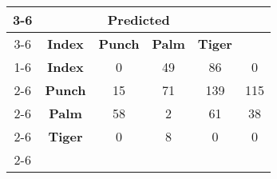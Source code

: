 \documentclass{standalone}
\begin{document}
 
 \begin{tabular}{|c |c |c |c |c |c |}
\cline{3-6}\multicolumn{2}{c|}{} & \multicolumn{4}{c|}{\textbf{Predicted}} \\ 
\cline{3-6} \multicolumn{2}{c |}{ } & \textbf{Index} & \textbf{Punch} & \textbf{Palm} & \textbf{Tiger}\\ 
\cline{1-6}\multirow{4}{*}{\rotatebox[origin=c]{90}{\textbf{Actual}}} & \textbf{Index} & 0 & 49 & 86 & 0\\ 
 \cline{2-6} & \textbf{Punch} & 15 & 71 & 139 & 115\\ 
 \cline{2-6} & \textbf{Palm} & 58 & 2 & 61 & 38\\ 
 \cline{2-6} & \textbf{Tiger} & 0 & 8 & 0 & 0\\ 
 \cline{2-6}\hline \end{tabular}
 
\end{document}
